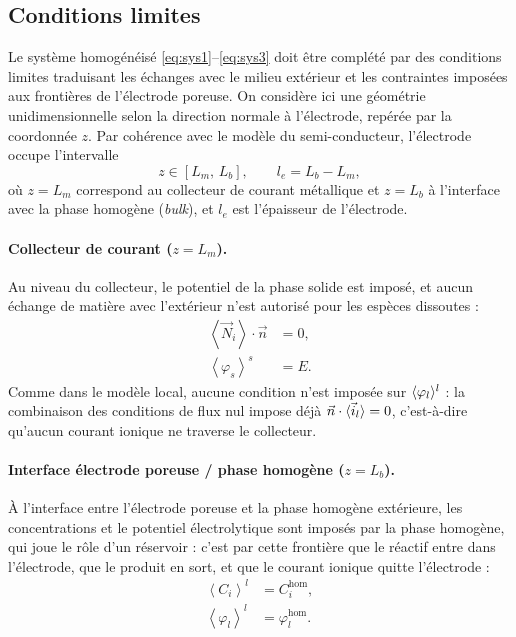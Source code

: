 \subsection*{Conditions limites}

Le système homogénéisé \eqref{eq:sys1}--\eqref{eq:sys3} doit être complété
par des conditions limites traduisant les échanges avec le milieu extérieur
et les contraintes imposées aux frontières de l'électrode poreuse.
On considère ici une géométrie unidimensionnelle selon la direction
normale à l'électrode, repérée par la coordonnée $z$. Par cohérence avec le
modèle du semi-conducteur, l'électrode occupe l'intervalle
\begin{equation}
z \in [L_m,\, L_b], \qquad l_e = L_b - L_m ,
\label{eq:domaine1D}
\end{equation}
où $z = L_m$ correspond au collecteur de courant métallique et $z = L_b$ à
l'interface avec la phase homogène (\emph{bulk}), et $l_e$ est l'épaisseur
de l'électrode.

\paragraph{Collecteur de courant ($z = L_m$).}

Au niveau du collecteur, le potentiel de la phase solide est imposé, et aucun
échange de matière avec l'extérieur n'est autorisé pour les espèces
dissoutes :
\begin{align}
\left\langle \vec{N}_i \right\rangle \cdot \vec{n} &= 0, \\
\left\langle \varphi_s \right\rangle^s &= E .
\end{align}
Comme dans le modèle local, aucune condition n'est imposée sur
$\langle \varphi_l \rangle^l$ : la combinaison des conditions de flux nul impose déjà
$\vec{n}\cdot\langle \vec{i}_l \rangle = 0$, c'est-à-dire qu'aucun courant ionique ne
traverse le collecteur.

\paragraph{Interface électrode poreuse / phase homogène ($z = L_b$).}

À l'interface entre l'électrode poreuse et la phase homogène extérieure, les
concentrations et le potentiel électrolytique sont imposés par la phase
homogène, qui joue le rôle d'un réservoir : c'est par cette frontière que le
réactif entre dans l'électrode, que le produit en sort, et que le courant
ionique quitte l'électrode :
\begin{align}
\left\langle C_i \right\rangle^l &= C_i^{\mathrm{hom}}, \\
\left\langle \varphi_l \right\rangle^l &= \varphi_l^{\mathrm{hom}} .
\end{align}

